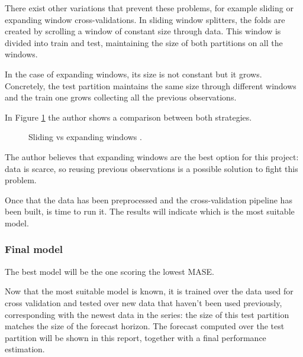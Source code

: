 There exist other variations that prevent these problems, for example sliding or expanding window cross-validations.
In sliding window splitters, the folds are created by scrolling a window of constant size through data.
This window is divided into train and test, maintaining the size of both partitions on all the windows.

In the case of expanding windows, its size is not constant but it grows.
Concretely, the test partition maintains the same size through different windows and the train one grows collecting all the previous observations.

In Figure \ref{fig:sliding-expanding-windows} the author shows a comparison between both strategies.

\begin{figure}[H]
\centering
    \caption{Sliding vs expanding windows \cite{sliding-expanding-windows}.}
    \label{fig:sliding-expanding-windows}
\end{figure}

The author believes that expanding windows are the best option for this project: data is scarce, so reusing previous observations is a possible solution to fight this problem.

Once that the data has been preprocessed and the cross-validation pipeline has been built, is time to run it.
The results will indicate which is the most suitable model.

\subsubsection{Final model}
The best model will be the one scoring the lowest MASE.

Now that the most suitable model is known, it is trained over the data used for cross validation and tested over new data that haven't been used previously, corresponding with the newest data in the series: the size of this test partition matches the size of the forecast horizon. The forecast computed over the test partition will be shown in this report, together with a final performance estimation.

